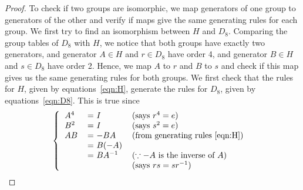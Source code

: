 \documentclass{article}
\begin{document}
\begin{enumerate}
\begin{enumerate}
\begin{proof}
          To check if two groups are isomorphic, we map generators of one
          group to generators of the other and verify if maps give the same
          generating rules for each group. We first try to find an
          isomorphism between $H$ and $D_8$. Comparing the group tables of
          $D_8$ with $H$, we notice that both groups have exactly two
          generators, and generator $A\in H$ and $r\in D_8$ have order 4,
          and generator $B\in H$ and $s\in D_8$ have order 2. Hence, we map
          $A$ to $r$ and $B$ to $s$ and check if this map gives us the same
          generating rules for both groups. We first check that the rules
          for $H$, given by equations~\ref{eqn:H}, generate the rules for
          $D_8$, given by equations~\ref{eqn:D8}. This is true since
          \[\left \{
            \begin{tabular}{lll}
              $A^4$ & = $I$         & (says $r^4=e$) \\
              $B^2$ & = $I$         & (says $s^2=e$) \\
              $AB$  & = $-BA$       & (from generating rules~\ref{eqn:H}) \\
                    & = $B(-A)$     & \\
                    & = $BA^{-1}$   & ($\because -A$ is the inverse of $A$) \\
                    &               & (says $rs=sr^{-1}$) \\
            \end{tabular}
          \right .\ \]


\end{proof}
\end{enumerate}
\end{enumerate}
\end{document}
